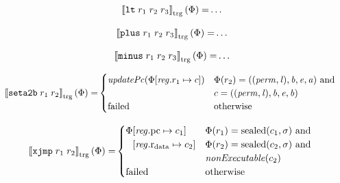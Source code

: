 \documentclass[a4paper]{article}
\newcommand{\sem}[1]{\left\llbracket #1 \right\rrbracket}
\newcommand{\tsem}[2][\Phi]{\sem{#2}_{\mathrm{trg}}(#1)}
\newcommand{\tand}{\text{ and }}
\newcommand{\totherwise}{\text{otherwise }}
\newcommand{\targetcolor}[1]{\color{black}}
\newcommand{\trg}[1]{{\targetcolor{} #1}}
\newcommand{\zinstr}[1]{\texttt{#1}}
\newcommand{\twoinstr}[3]{
  \ifthenelse{\equal{#2#3}{}}
  {\zinstr{#1}}
  {\zinstr{#1} \; #2 \; #3}
}
\newcommand{\threeinstr}[4]{
  \ifthenelse{\equal{#2#3#4}{}}
  {\zinstr{#1}}
  {\zinstr{#1} \; #2 \; #3 \; #4}
}
\newcommand{\txjmp}[2]{\twoinstr{\trg{xjmp}}{#1}{#2}}
\newcommand{\tsetatob}[2]{\twoinstr{\trg{seta2b}}{#1}{#2}}
\newcommand{\tlt}[3]{\threeinstr{\trg{lt}}{#1}{#2}{#3}}
\newcommand{\tplus}[3]{\threeinstr{\trg{plus}}{#1}{#2}{#3}}
\newcommand{\tminus}[3]{\threeinstr{\trg{minus}}{#1}{#2}{#3}}
\newcommand{\update}[2]{[#1 \mapsto #2]}
\newcommand{\shareddom}[1]{\mathrm{#1}}
\newcommand{\perm}{\var{perm}}
\newcommand{\lin}{\var{l}}
\newcommand{\sealed}[1]{\shareddom{sealed}(#1)}
\newcommand{\failed}{\mathrm{failed}}
\newcommand{\var}[1]{\mathit{#1}}
\newcommand{\reg}{\var{reg}}
\newcommand{\baddr}{\var{b}}
\newcommand{\eaddr}{\var{e}}
\newcommand{\aaddr}{\var{a}}
\newcommand{\pcreg}{\mathrm{pc}}
\newcommand{\rdata}{\mathrm{r}_\mathrm{data}}
\newcommand{\plainfun}[2]{
  \ifthenelse{\equal{#2}{}}
  {\mathit{#1}}
  {\mathit{#1}(#2)}
}
\newcommand{\updPcAddr}[1]{\plainfun{updatePc}{#1}}
\newcommand{\nonExec}[1]{\plainfun{nonExecutable}{#1}}
\begin{document}
\begin{align*}
  \tsem{\tlt{r_1}{r_2}{r_3}} = & \dots
\end{align*}

\begin{align*}
  \tsem{\tplus{r_1}{r_2}{r_3}} = & \dots
\end{align*}

\begin{align*}
  \tsem{\tminus{r_1}{r_2}{r_3}} = & \dots
\end{align*}

\begin{align*}
  \tsem{\tsetatob{r_1}{r_2}} = & 
                                 \begin{cases}
                                   \updPcAddr{\Phi\update{\reg.r_1}{c}} &
                                   \arraycolsep=0pt
                                   \begin{array}[t]{l}
                                     \Phi(r_2) = ((\perm,\lin),\baddr,\eaddr,\aaddr) \tand \\
                                     c = ((\perm,\lin),\baddr,\eaddr,\baddr) \\
                                   \end{array}
                                   \\
                                   \failed & \totherwise
                                 \end{cases}
\end{align*}

\begin{align*}
  \tsem{\txjmp{r_1}{r_2}} = & 
                              \begin{cases}
                                \Phi
                                \arraycolsep=0pt
                                \begin{array}[t]{l}
                                  \update{\reg.\pcreg}{c_1} \\
                                  \update{\reg.\rdata}{c_2}
                                \end{array} & 
                                \arraycolsep=0pt
                                \begin{array}[t]{l}
                                  \Phi(r_1) = \sealed{c_1,\sigma} \text{ and } \\
                                  \Phi(r_2) = \sealed{c_2,\sigma} \text{ and } \\
                                  \nonExec{c_2}
                                \end{array}
\\
\failed & \text{otherwise}
                              \end{cases}
\end{align*}
\end{document}
